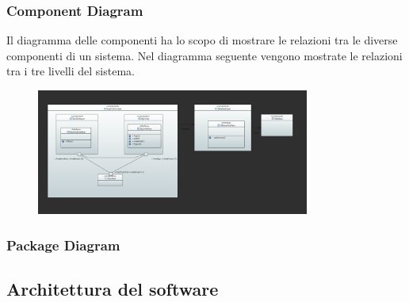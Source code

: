 \documentclass[a4paper,12pt]{article}
\begin{document}
\subsubsection{Component Diagram}
Il diagramma delle componenti ha lo scopo di mostrare le relazioni tra le diverse componenti di un sistema. Nel diagramma seguente vengono mostrate le relazioni tra i tre livelli del sistema.
\begin{figure}[H]
    \centering
    \includegraphics[width=0.8\textwidth]{../UML/UML png/diagramma dei Componenti.png}
    \label{fig:Component Diagram}
\end{figure}
\subsubsection{Package Diagram}

\subsection{Architettura del software}
\end{document}
